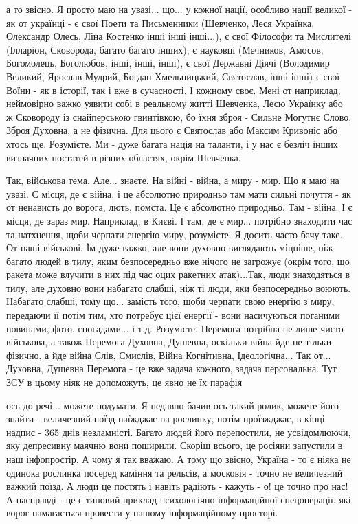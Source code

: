 а то звісно. Я просто маю на увазі... що... у кожної нації, особливо нації
великої - як от українці - є свої Поети та Письменники (Шевченко, Леся
Українка, Олександр Олесь, Ліна Костенко інші інші інші...), є свої Філософи та
Мислителі (Ілларіон, Сковорода, багато багато інших), є науковці (Мечников,
Амосов, Богомолець, Боголюбов, інші, інші, інші), є свої Державні Діячі
(Володимир Великий, Ярослав Мудрий, Богдан Хмельницький, Святослав, інші інші)
є свої Воїни - як в історії, так і вже в сучасності. І кожному своє. Мені от
наприклад, неймовірно важко уявити собі в реальному житті Шевченка, Лесю
Українку або ж Сковороду із снайперською гвинтівкою, бо їхня зброя - Сильне
Могутнє Слово, Зброя Духовна, а не фізична. Для цього є Святослав або Максим
Кривоніс або хтось ще. Розумієте. Ми - дуже багата нація на таланти, і у нас є
безліч інших визначних постатей в різних областях, окрім Шевченка.

Так, військова тема. Але... знаєте. На війні - війна, а миру - мир. Що я маю на
увазі. Є місця, де є війна, і це абсолютно природньо там мати сильні почуття -
як от ненависть до ворога, лють, помста. Це є абсолютно природньо. Там - війна.
І є місця, де зараз мир. Наприклад, в Києві. І там, де є мир... потрібно
знаходити час та натхнення, щоби черпати енергію миру, розумієте. Я досить
часто бачу таке. От наші військові. Їм дуже важко, але вони духовно виглядають
міцніше, ніж багато людей в тилу, яким безпосередньо вже нічого не загрожує
(окрім того, що ракета може влучити в них під час оцих ракетних атак)...Так,
люди знаходяться в тилу, але духовно вони набагато слабші, ніж ті люди, яки
безпосередньо воюють. Набагато слабші, тому що... замість того, щоби черпати
свою енергію з миру, передаючи її потім тим, хто потребує цієї енергії - вони
насичуються поганими новинами, фото, спогадами...  і т.д. Розумієте. Перемога
потрібна не лише чисто військова, а також Перемога Духовна, Душевна, оскільки
війна йде не тільки фізично, а йде війна Слів, Смислів, Війна Когнітивна,
Ідеологічна... Так от... Духовна, Душевна Перемога -  це вже задача кожного,
задача персональна. Тут ЗСУ в цьому ніяк не допоможуть, це явно не їх парафія

ось до речі... можете подумати. Я недавно бачив ось такий ролик, можете його
знайти - величезний поїзд наїжджає на рослинку, потім проїзжджає, в кінці
надпис - 365 днів незламністі. Багато людей його перепостили, не усвідомлюючи,
яку депресивну маячню вони поширили. Скоріш всього, це росіяни запустили в наш
інфопростір. А чому я так вважаю. А тому що звісно, Україна - то є ніяка не
одинока рослинка посеред каміння та рельсів, а московія - точно не величезний
важкий поїзд. А люди це постять і навіть радіють - кажуть - о! це точно про
нас! А насправді - це є типовий приклад психологічно-інформаційної
спецоперації, які ворог намагається провести у нашому інформаційному просторі.

